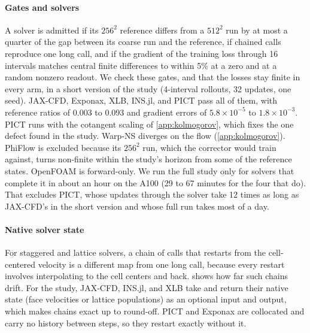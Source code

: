 \paragraph{Gates and solvers}
A solver is admitted if its $256^2$ reference differs from a $512^2$ run by at
most a quarter of the gap between its coarse run and the reference, if chained
calls reproduce one long call, and if the gradient of the training loss through
16 intervals matches central finite differences to within 5\% at a zero and at
a random nonzero readout. We check these gates, and that the losses stay finite
in every arm, in a short version of the study (4-interval rollouts, 32 updates,
one seed). JAX-CFD, Exponax, XLB, INS.jl, and PICT pass all of them, with reference
ratios of 0.003 to 0.093 and gradient errors of $5.8\times10^{-5}$ to
$1.8\times10^{-3}$. PICT runs with the cotangent scaling of
\cref{app:kolmogorov}, which fixes the one defect found in the study. Warp-NS
diverges on the flow (\cref{app:kolmogorov}).
PhiFlow is excluded because its $256^2$ run, which the corrector would train
against, turns non-finite within the study's horizon from some of the
reference states. OpenFOAM is forward-only.
We run the full study only for solvers that complete it in about an hour on the A100
(29 to 67 minutes for the four that do). That excludes PICT, whose updates
through the solver take 12 times as long as JAX-CFD's in the short version and
whose full run takes most of a day.

\paragraph{Native solver state}
For staggered and lattice solvers, a chain of calls that restarts from the
cell-centered velocity is a different map from one long call, because every
restart involves interpolating to the cell centers and back.
 shows how far such chains drift. For the study,
JAX-CFD, INS.jl, and XLB take and return their native state (face velocities or
lattice populations) as an optional input and output, which makes chains exact
up to round-off. PICT and Exponax are collocated and carry no history between
steps, so they restart exactly without it.

